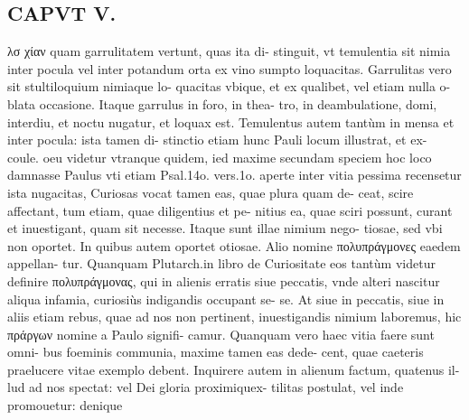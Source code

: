 \documentclass{article}
\begin{document}
\begin{pages}
\section*{CAPVT  V. }
\marginpar{[ p.287 ]}
\marginpar{[ p.O ]}\pstart λσ χίαν quam garrulitatem vertunt, quas ita di- stinguit, vt temulentia sit nimia inter pocula vel inter potandum orta ex vino sumpto loquacitas. Garrulitas vero sit stultiloquium nimiaque lo- quacitas vbique, et ex qualibet, vel etiam nulla o- blata occasione. Itaque garrulus in foro, in thea- tro, in deambulatione, domi, interdiu, et noctu nugatur, et loquax est. Temulentus autem tantùm in mensa et inter pocula: ista tamen di- stinctio etiam hunc Pauli locum illustrat, et ex- coule. oeu videtur vtranque quidem, ied maxime secundam speciem hoc loco damnasse Paulus vti etiam Psal.14o. vers.1o. aperte inter vitia pessima recensetur ista nugacitas,  \pend\pstart Curiosas vocat tamen eas, quae plura quam de- ceat, scire affectant, tum etiam, quae diligentius et pe- nitius ea, quae sciri possunt, curant et inuestigant, quam sit necesse. Itaque sunt illae nimium nego- tiosae, sed vbi non oportet. In quibus autem oportet otiosae. Alio nomine πολυπράγμονες eaedem appellan- tur. Quanquam Plutarch.in libro de Curiositate eos tantùm videtur definire πολυπράγμονας, qui in alienis erratis siue peccatis, vnde alteri nascitur aliqua infamia, curiosiùs indigandis occupant se- se. At siue in peccatis, siue in aliis etiam rebus, quae ad nos non pertinent, inuestigandis nimium laboremus, hic πράργων nomine a Paulo signifi- camur. Quanquam vero haec vitia faere sunt omni- bus foeminis communia, maxime tamen eas dede- cent, quae caeteris praelucere vitae exemplo debent. Inquirere autem in alienum factum, quatenus il- lud ad nos spectat: vel Dei gloria proximiquex- tilitas postulat, vel inde promouetur: denique  \pend

\end{pages}
\end{document}
